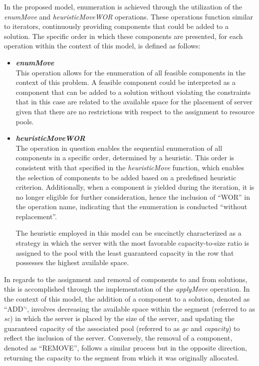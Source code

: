 In the proposed model, enumeration is achieved through the utilization of the
\textit{enumMove} and \textit{heuristicMoveWOR} operations. These operations
function similar to iterators, continuously providing components that could be
added to a solution. The specific order in which these components are presented,
for each operation within the context of this model, is defined as follows:

\begin{itemize} \item \textbf{{\textit{enumMove}}}\\ This operation allows for
        the enumeration of all feasible components in the context of this problem. A
        feasible component could be interpreted as a component that can be added to a
        solution without violating the constraints that in this case are related to the
        available space for the placement of server given that there are no restrictions
        with respect to the assignment to resource pools.

  \item \textbf{{\textit{heuristicMoveWOR}}}\\ The operation in question enables
        the sequential enumeration of all components in a specific order, determined by
        a heuristic. This order is consistent with that specified in the
        \textit{heuristicMove} function, which enables the selection of components to be
        added based on a predefined heuristic criterion. Additionally, when a component
        is yielded during the iteration, it is no longer eligible for further
        consideration, hence the inclusion of ``WOR'' in the operation name, indicating
        that the enumeration is conducted ``without replacement''.

        The heuristic employed in this model can be succinctly characterized as a
        strategy in which the server with the most favorable capacity-to-size ratio is
        assigned to the pool with the least guaranteed capacity in the row that
        possesses the highest available space. \end{itemize}

In regards to the assignment and removal of components to and from solutions,
this is accomplished through the implementation of the \textit{applyMove}
operation. In the context of this model, the addition of a component to a
solution, denoted as ``ADD'`, involves decreasing the available space within the
segment (referred to as \textit{sc}) in which the server is placed by the size
of the server, and updating the guaranteed capacity of the associated pool
(referred to as \textit{gc} and \textit{capacity}) to reflect the inclusion of
the server. Conversely, the removal of a component, denoted as ``REMOVE'',
follows a similar process but in the opposite direction, returning the capacity
to the segment from which it was originally allocated.

